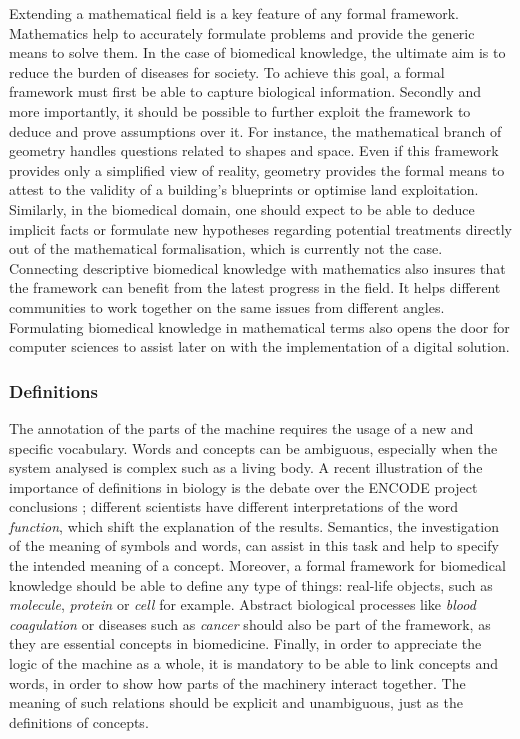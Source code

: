Extending a mathematical field is a key feature of any formal framework. Mathematics help to accurately formulate problems and provide the generic means to solve them. In the case of biomedical knowledge, the ultimate aim is to reduce the burden of diseases for society. To achieve this goal, a formal framework must first be able to capture biological information. Secondly and more importantly, it should be possible to further exploit the framework to deduce and prove assumptions over it. For instance, the mathematical branch of geometry handles questions related to shapes and space. Even if this framework provides only a simplified view of reality, geometry provides the formal means to attest to the validity of a building's blueprints or optimise land exploitation. Similarly, in the biomedical domain, one should expect to be able to deduce implicit facts or formulate new hypotheses regarding potential treatments directly out of the mathematical formalisation, which is currently not the case. Connecting descriptive biomedical knowledge with mathematics also insures that the framework can benefit from the latest progress in the field. It helps different communities to work together on the same issues from different angles. Formulating biomedical knowledge in mathematical terms also opens the door for computer sciences to assist later on with the implementation of a digital solution.

\subsubsection{Definitions}
\label{reqdef}

The annotation of the parts of the machine requires the usage of a new and specific vocabulary. Words and concepts can be ambiguous, especially when the system analysed is complex such as a living body. A recent illustration of the importance of definitions in biology is the debate over the ENCODE project conclusions \citep{Form_and_function_2013}; different scientists have different interpretations of the word \emph{function}, which shift the explanation of the results. Semantics, the investigation of the meaning of symbols and words, can assist in this task and help to specify the intended meaning of a concept. Moreover, a formal framework for biomedical knowledge should be able to define any type of things: real-life objects, such as \emph{molecule}, \emph{protein} or \emph{cell} for example. Abstract biological processes like \emph{blood coagulation} or diseases such as \emph{cancer} should also be part of the framework, as they are essential concepts in biomedicine. Finally, in order to appreciate the logic of the machine as a whole, it is mandatory to be able to link concepts and words, in order to show how parts of the machinery interact together. The meaning of such relations should be explicit and unambiguous, just as the definitions of concepts.

